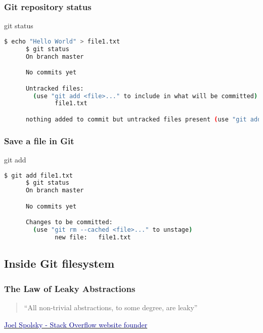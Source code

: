 \begin{frame}[fragile]\frametitle{Git repository status}
   \begin{center}
      \Huge git status \normalsize
   \end{center}
   \begin{lstlisting}[language=bash, style=bash, autogobble]
      $ echo "Hello World" > file1.txt
      $ git status
      On branch master

      No commits yet

      Untracked files:
        (use "git add <file>..." to include in what will be committed)
              file1.txt

      nothing added to commit but untracked files present (use "git add" to track)
   \end{lstlisting}
\end{frame}

\begin{frame}[fragile]\frametitle{Save a file in Git}
   \begin{center}
      \Huge git add \normalsize
   \end{center}
   \begin{lstlisting}[language=bash, style=bash]
      $ git add file1.txt
      $ git status
      On branch master

      No commits yet

      Changes to be committed:
        (use "git rm --cached <file>..." to unstage)
              new file:   file1.txt
   \end{lstlisting}
\end{frame}

\subsection{Inside Git filesystem}

\begin{frame}\frametitle{The Law of Leaky Abstractions}
   \begin{quote}
      ``All non-trivial abstractions, to some degree, are leaky'' \\
   \end{quote}
   \vspace{-1em}
   \begin{flushright}
      \href{https://www.joelonsoftware.com/2002/11/11/the-law-of-leaky-abstractions/}
      {\textcolor{DarkBlue}{Joel Spolsky - Stack Overflow website founder}}
   \end{flushright}
\end{frame}

